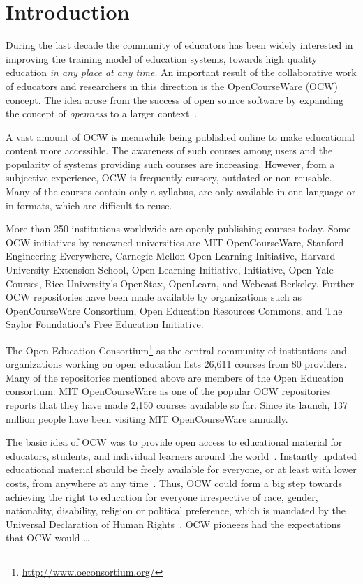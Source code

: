 \documentclass{sig-alternate}
\theoremstyle{definition}
\begin{document}
\noindent\section{Introduction}

During the last decade the community of educators has been widely interested in improving the training model of education systems, towards high quality education \emph{in any place at any time}.
An important result of the collaborative work of educators and researchers in this direction is the OpenCourseWare (OCW) concept.
The idea arose from the success of open source software by expanding the concept of \emph{openness} to a larger context~\parencite{Vladoiu.2011}.

A vast amount of OCW is meanwhile being published online to make educational content more accessible.
The awareness of such courses among users and the popularity of systems providing such courses are increasing.
However, from a subjective experience, OCW is frequently cursory, outdated or non-reusable.
Many of the courses contain only a syllabus, are only available in one language or in formats, which are difficult to reuse.

More than 250 institutions worldwide are openly publishing courses today.
Some OCW initiatives by renowned universities are MIT OpenCourseWare, Stanford Engineering Everywhere,
Carnegie Mellon Open Learning Initiative, Harvard University Extension School, Open Learning Initiative,
Initiative, Open Yale Courses, Rice University’s OpenStax, OpenLearn, and Webcast.Berkeley.
Further OCW repositories have been made available by organizations such as OpenCourseWare Consortium, Open Education Resources Commons, and The Saylor Foundation’s Free Education Initiative.

The Open Education Consortium\footnote{\url{http://www.oeconsortium.org/}} as the central community of institutions and organizations working on open education lists 26,611 courses from 80 providers.
Many of the repositories mentioned above are members of the Open Education consortium.
MIT OpenCourseWare as one of the popular OCW repositories reports that they have made 2,150 courses available so far.
Since its launch, 137 million people have been visiting MIT OpenCourseWare annually.




The basic idea of OCW was to provide open access to educational material for educators, students, and individual learners around the world~\parencite{MIT2006}.
Instantly updated educational material should be freely available for everyone, or at least with lower costs, from anywhere at any time~\parencite{UNESCO.2002}.
Thus, OCW could form a big step towards achieving the right to education for everyone irrespective of race, gender, nationality, disability, religion or political preference, which is mandated by the Universal Declaration of Human Rights~\parencite{UnitedNations1948}.
OCW pioneers had the expectations that OCW would …
\end{document}
